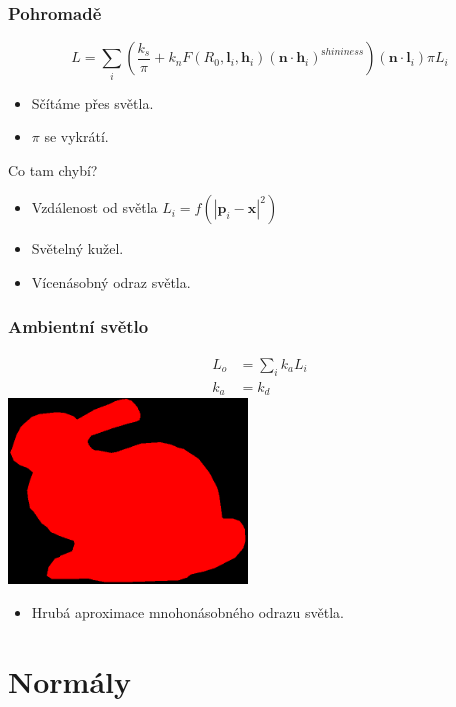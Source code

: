 \begin{frame}
    \frametitle{Pohromadě}
    \begin{equation*}
        L = \sum_i \left(\frac{k_s}{\pi} + k_n F(R_0, \mathbf l_i,\mathbf h_i)(\mathbf n \cdot \mathbf h_i)^{\mathrm shininess}\right)(\mathbf n \cdot \mathbf l_i) \pi L_i
    \end{equation*}
    \begin{itemize}
        \item Sčítáme přes světla.
        \item $\pi$ se vykrátí.
    \end{itemize}
    \pause
    \vfill
    Co tam chybí?
    \pause
    \begin{itemize}
        \item Vzdálenost od světla $L_i = f(|\mathbf p_i - \mathbf x|^2)$
        \item Světelný kužel.
        \item Vícenásobný odraz světla.
    \end{itemize}
\end{frame}

\begin{frame}
    \frametitle{Ambientní světlo}
    \begin{align*}
        L_o &= \sum_i k_a L_i \\
        k_a &= k_d 
    \end{align*}
    \vfill
    \includegraphics[width=2.5in]{pics/physicallyBasedRendering/ambient}
    \begin{itemize}
        \item Hrubá aproximace mnohonásobného odrazu světla.
    \end{itemize}
\end{frame}

\section{Normály}


